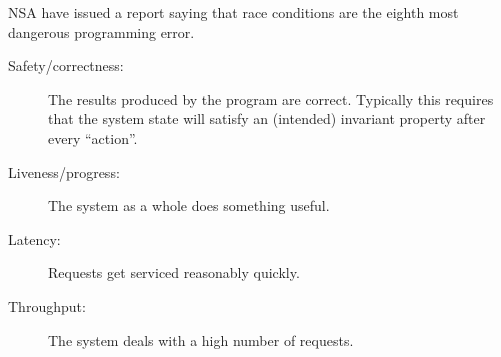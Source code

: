 \documentclass[notes,color]{sepslide0}
\begin{document}







\begin{selfnote}
NSA have issued a report saying that race conditions are the eighth most
dangerous programming error.
\end{selfnote}


\begin{slide}

\begin{description}
\item[Safety/correctness:] The results produced by the program are correct.
  Typically this requires that the system state will satisfy an (intended)
  invariant property after every ``action''.

\item[Liveness/progress:] The system as a whole does something useful.
\end{description}

\bigskip


\begin{description}
\item[Latency:]
Requests get serviced reasonably quickly.

\item[Throughput:]
The system deals with a high number of requests.
\end{description}
\end{slide}

\end{document}
